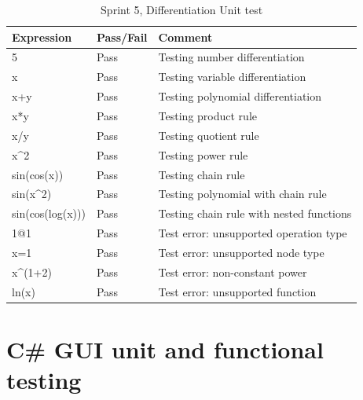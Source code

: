 \documentclass[a4paper, oneside, 11pt]{report}
\begin{document}
\begin{table}[h]
\caption{Sprint 5, Differentiation Unit test}
\label{sprint5-differentiation-unit-test}
\begin{tabular}{|l|l|l|}
\hline
\textbf{Expression}       & \textbf{Pass/Fail} & \textbf{Comment}                         \\ \hline
5                         & Pass               & Testing number differentiation           \\ \hline
x                         & Pass               & Testing variable differentiation         \\ \hline
x+y                       & Pass               & Testing polynomial differentiation       \\ \hline
x*y                       & Pass               & Testing product rule                     \\ \hline
x/y                       & Pass               & Testing quotient rule                    \\ \hline
x\textasciicircum{}2      & Pass               & Testing power rule                       \\ \hline
sin(cos(x))               & Pass               & Testing chain rule                       \\ \hline
sin(x\textasciicircum{}2) & Pass               & Testing polynomial with chain rule       \\ \hline
sin(cos(log(x)))          & Pass               & Testing chain rule with nested functions \\ \hline
1@1                       & Pass               & Test error: unsupported operation type   \\ \hline
x=1                       & Pass               & Test error: unsupported node type        \\ \hline
x\textasciicircum{}(1+2)  & Pass               & Test error: non-constant power           \\ \hline
ln(x)                     & Pass               & Test error: unsupported function         \\ \hline
\end{tabular}
\end{table}

\newpage
\section{C\# GUI unit  and functional testing}
\end{document}
